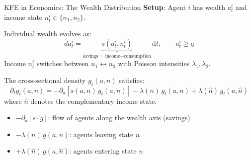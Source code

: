 \documentclass[aspectratio=169,11pt]{beamer}
\newcommand{\emphc}[1]{\textcolor{harvardcrimson}{#1}}
\newcommand{\ud}{\,\mathrm{d}}
\newcommand{\ubar}[1]{\underline{#1}}
\begin{document}
\begin{frame}{KFE in Economics: The Wealth Distribution}
\small
\textbf{Setup}: Agent $i$ has wealth $a_t^i$ and income state $n_t^i \in \{n_1, n_2\}$.

\vspace{0.1em}
Individual wealth evolves as:
\[
da_t^i = \underbrace{s(a_t^i, n_t^i)}_{\text{savings = income} - \text{consumption}}\ud t, \qquad a_t^i \geq \ubar{a}
\]
Income $n_t^i$ switches between $n_1 \leftrightarrow n_2$ with Poisson intensities $\lambda_1, \lambda_2$.

\vspace{0.1em}
The \emphc{cross-sectional density} $g_t(a, n)$ satisfies:
\[
\boxed{\partial_t g_t(a,n) = -\partial_a\!\left[s(a,n)\,g_t(a,n)\right] - \lambda(n)\,g_t(a,n) + \lambda(\hat{n})\,g_t(a,\hat{n})}
\]
where $\hat{n}$ denotes the complementary income state.

\vspace{0.1em}
\begin{itemize}\itemsep2pt
    \item $-\partial_a[s \cdot g]$: flow of agents along the wealth axis (savings)
    \item $-\lambda(n)\,g(a,n)$: agents \emphc{leaving} state $n$ 
    \item $+\lambda(\hat{n})\,g(a,\hat{n})$: agents \emphc{entering} state $n$ 
\end{itemize}
\end{frame}
\end{document}
